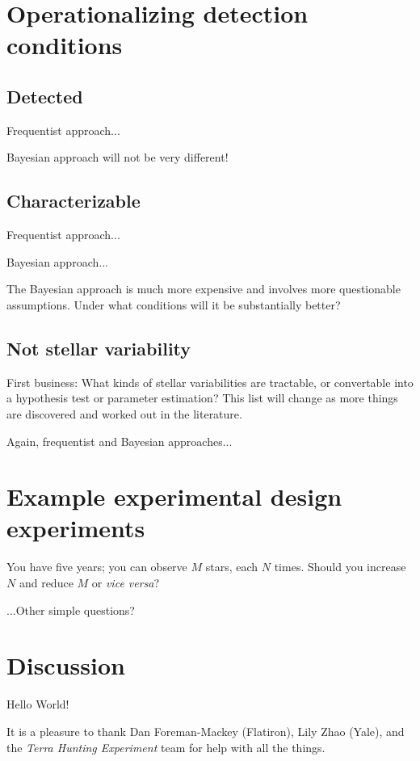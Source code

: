\documentclass[modern]{aastex63}
\newcommand{\foreign}[1]{\textsl{#1}}
\newcommand{\project}[1]{\textsl{#1}}
\begin{document}
\section{Operationalizing detection conditions}

\subsection{Detected}

Frequentist approach...

Bayesian approach will not be very different!

\subsection{Characterizable}

Frequentist approach...

Bayesian approach...

The Bayesian approach is much more expensive and involves more
questionable assumptions. Under what conditions will it be
substantially better?

\subsection{Not stellar variability}

First business: What kinds of stellar variabilities are tractable, or
convertable into a hypothesis test or parameter estimation? This list
will change as more things are discovered and worked out in the
literature.

Again, frequentist and Bayesian approaches...

\section{Example experimental design experiments}

You have five years; you can observe $M$ stars, each $N$ times. Should
you increase $N$ and reduce $M$ or \foreign{vice versa}?

...Other simple questions?

\section{Discussion}

Hello World!

\acknowledgments

It is a pleasure to thank
  Dan Foreman-Mackey (Flatiron),
  Lily Zhao (Yale),
  and
  the \project{Terra Hunting Experiment} team
for help with all the things.

\software{
}



\end{document}

